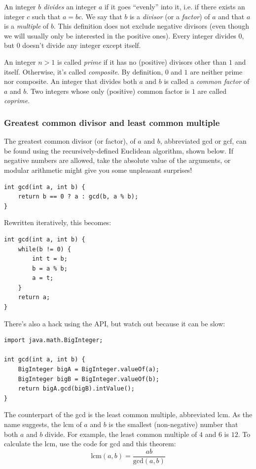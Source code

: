 \documentclass[a4paper,12pt]{article}
\begin{document}
An integer $b$ {\em divides} an integer $a$ if it goes ``evenly'' into it, i.e. if there exists an integer $c$ such that $a=bc$. We say that $b$ is a {\em divisor} (or a {\em factor}) of $a$ and that $a$ is a {\em multiple} of $b$. This definition does not exclude negative divisors (even though we will usually only be interested in the positive ones). Every integer divides $0$, but $0$ doesn't divide any integer except itself.

An integer $n>1$ is called {\em prime} if it has no (positive) divisors other than $1$ and itself. Otherwise, it's called {\em composite}. By definition, $0$ and $1$ are neither prime nor composite. An integer that divides both $a$ and $b$ is called a {\em common factor} of $a$ and $b$. Two integers whose only (positive) common factor is $1$ are called {\em coprime}.

\subsubsection{Greatest common divisor and least common multiple}

\noindent The greatest common divisor (or factor), of $a$ and $b$, abbreviated gcd or gcf, can be found using the recursively-defined Euclidean algorithm, shown below. If negative numbers are allowed, take the absolute value of the arguments, or modular arithmetic might give you some unpleasant surprises!

\begin{lstlisting}
int gcd(int a, int b) {
	return b == 0 ? a : gcd(b, a % b);
}
\end{lstlisting}

\noindent Rewritten iteratively, this becomes:

\begin{lstlisting}
int gcd(int a, int b) {
	while(b != 0) {
		int t = b;
		b = a % b;
		a = t;
	}
	return a;
}
\end{lstlisting}

\noindent There's also a hack using the API, but watch out because it can be slow:

\begin{lstlisting}
import java.math.BigInteger;

int gcd(int a, int b) {
	BigInteger bigA = BigInteger.valueOf(a);
	BigInteger bigB = BigInteger.valueOf(b);
	return bigA.gcd(bigB).intValue();
}
\end{lstlisting}

The counterpart of the gcd is the least common multiple, abbreviated lcm. As the name suggests, the lcm of $a$ and $b$ is the smallest (non-negative) number that both $a$ and $b$ divide. For example, the least common multiple of $4$ and $6$ is $12$. To calculate the lcm, use the code for gcd and this theorem:
\[\mathrm{lcm}(a,b) = \frac{ab}{\mathrm{gcd}(a,b)}\]
\end{document}
